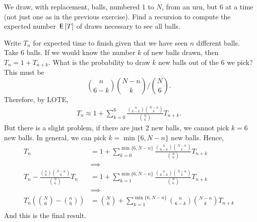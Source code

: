 \documentclass[lectures]{subfiles}
\begin{document}
\begin{exercise}
We draw, with replacement, balls, numbered 1 to $N$, from an urn, but 6 at a time (not just one as in the previous exercise).
Find a recursion to compute the expected number $\,\mathsf{E}\left[T\right]$ of draws necessary to see all balls.
\begin{solution}
  Write $T_{n}$ for expected time to finish given that we have seen $n$ different balls.
  Take 6 balls.
  If we would know the number $k$ of new balls drawn, then $T_{n} = 1 + T_{n+k}$.
  What is the probability to draw $k$ new balls  out of the 6 we pick?
  This must be
\begin{equation}
\label{eq:30}
{n \choose 6-k}{N-n \choose k}\big/{N \choose 6}.
\end{equation}
Therefore, by LOTE,
\begin{align}
T_{n}
\approx
1 + \sum_{k=0}^{6} \frac{{n \choose 6-k}{N-n \choose k}}{{N \choose 6}} T_{n+k}.
\end{align}
But there is a slight problem, if there are just 2 new balls,  we cannot pick $k=6$ new balls. In general, we can pick $k=\min\{6, N-n\}$ new balls. Hence,
\begin{align}
T_{n}
&=
1 + \sum_{k=0}^{\min\{6, N-n\}} \frac{{n \choose 6-k}{N-n \choose k}}{{N \choose 6}} T_{n+k} \\
&\implies \\
T_{n} - \frac{{n \choose 6}{N-n \choose 0}}{{N \choose 6}} T_{n}
&=1 + \sum_{k=1}^{\min\{6, N-n\}} \frac{{n \choose 6-k}{N-n \choose k}}{{N \choose 6}} T_{n+k} \\
&\implies \\
T_{n}\left( {N\choose 6}  -{n \choose 6} \right)
&={N\choose 6} + \sum_{k=1}^{\min\{6, N-n\}}{n \choose 6-k}{N-n \choose k} T_{n+k} \\
\end{align}
And this is the final result.

\end{solution}
\end{exercise}
\end{document}

